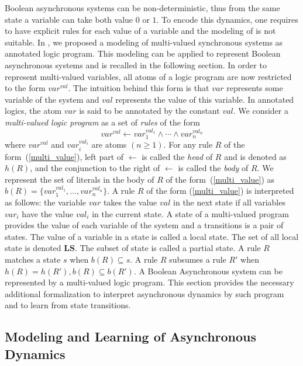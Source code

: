 	Boolean asynchronous systems can be non-deterministic, thus from the same state a variable can take both value $0$ or $1$.
	To encode this dynamics, one requires to have explicit rules for each value of a variable and the modeling of \cite{ribeiro2015learning} is not suitable.
	In \cite{DMTRICLP15}, we proposed a modeling of multi-valued synchronous systems as annotated logic program.
    This modeling can be applied to represent Boolean asynchronous systems and is recalled in the following section.
	In order to represent multi-valued variables, all atoms of a logic program are now restricted to the form $var^{val}$.
	The intuition behind this form is that $var$ represents some variable of the system and $val$ represents the value of this variable.
	In annotated logics, the atom $var$ is said to be annotated by the constant $val$.
	We consider a {\it multi-valued logic program\/} as a set of {\it rules\/} of the form  
	\begin{equation}\label{multi_value}
		var^{val} \leftarrow var_1^{val_1} \wedge \cdots \wedge var_n^{val_n}
	\end{equation}
	where $var^{val}$ and $var_i^{val_i}$ are atoms $(n \geq 1)$.
	For any rule $R$ of the form~(\ref{multi_value}), left part of $\leftarrow$ is called the {\it head\/} of $R$ and is denoted as $h(R)$,
	and the conjunction to the right of $\leftarrow$ is called the {\it body\/} of $R$.  
	We represent the set of literals in the body of $R$ of the form~(\ref{multi_value}) as $b(R)=\{var_1^{val_1},\ldots,var_n^{val_n}\}$. 
	A rule $R$ of the form (\ref{multi_value}) is interpreted as follows:
	the variable $var$ takes the value $val$ in the next state if all variables $var_i$ have the value $val_i$ in the current state.
	A state of a multi-valued program provides the value of each variable of the system and a transitions is a pair of states.
	The value of a variable in a state is called a local state.
	The set of all local state is denoted $\mathbf{LS}$.
	The subset of state is called a partial state.
	A rule $R$ matches a state $s$ when $b(R) \subseteq s$.
	A rule $R$ subsumes a rule $R'$ when $h(R)=h(R'), b(R) \subseteq b(R')$.
%
A Boolean Asynchronous system can be represented by a multi-valued logic program.
This section provides the necessary additional formalization to interpret asynchronous dynamics by such program and to learn from state transitions.

\subsection{Modeling and Learning of Asynchronous Dynamics}\label{sec:alfit}

